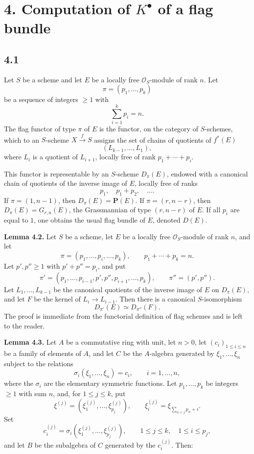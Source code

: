 \documentclass[11pt]{article}
\begin{document}
\section*{4. Computation of \(K^\bullet\) of a flag bundle}

\subsection*{4.1}
Let \(S\) be a scheme and let \(E\) be a locally free \(\mathcal O_S\)-module of rank \(n\). Let
\[
  \pi=(p_1,\ldots,p_k)
\]
be a sequence of integers \(\geq1\) with
\[
  \sum_{i=1}^{k}p_i=n.
\]
The flag functor of type \(\pi\) of \(E\) is the functor, on the category of \(S\)-schemes, which to an \(S\)-scheme \(X\xrightarrow f S\) assigns the set of chains of quotients of \(f^*(E)\)
\[
  (L_{k-1},\ldots,L_1),
\]
where \(L_i\) is a quotient of \(L_{i+1}\), locally free of rank \(p_1+\cdots+p_i\).

This functor is representable by an \(S\)-scheme \(D_\pi(E)\), endowed with a canonical chain of quotients of the inverse image of \(E\), locally free of ranks
\[
  p_1,\quad p_1+p_2,\quad \ldots .
\]
If \(\pi=(1,n-1)\), then \(D_\pi(E)=\mathbf P(E)\). If \(\pi=(r,n-r)\), then \(D_\pi(E)=G_{r,n}(E)\), the Grassmannian of type \((r,n-r)\) of \(E\). If all \(p_i\) are equal to \(1\), one obtains the usual flag bundle of \(E\), denoted \(D(E)\).

\textbf{Lemma 4.2.} Let \(S\) be a scheme, let \(E\) be a locally free \(\mathcal O_S\)-module of rank \(n\), and let
\[
  \pi=(p_1,\ldots,p_i,\ldots,p_k),\qquad p_1+\cdots+p_k=n.
\]
Let \(p',p''\geq1\) with \(p'+p''=p_i\), and put
\[
  \pi'=(p_1,\ldots,p_{i-1},p',p'',p_{i+1},\ldots,p_k),
  \qquad
  \pi''=(p',p'').
\]
Let \(L_1,\ldots,L_{k-1}\) be the canonical quotients of the inverse image of \(E\) on \(D_\pi(E)\), and let \(F\) be the kernel of \(L_i\to L_{i-1}\). Then there is a canonical \(S\)-isomorphism
\[
  D_{\pi'}(E)\simeq D_{\pi''}(F).
\]
The proof is immediate from the functorial definition of flag schemes and is left to the reader.

\textbf{Lemma 4.3.} Let \(A\) be a commutative ring with unit, let \(n>0\), let \((c_i)_{1\leq i\leq n}\) be a family of elements of \(A\), and let \(C\) be the \(A\)-algebra generated by \(\xi_1,\ldots,\xi_n\) subject to the relations
\[
  \sigma_i(\xi_1,\ldots,\xi_n)=c_i,\qquad i=1,\ldots,n,
\]
where the \(\sigma_i\) are the elementary symmetric functions. Let \(p_1,\ldots,p_k\) be integers \(\geq1\) with sum \(n\), and, for \(1\leq j\leq k\), put
\[
  \xi^{(j)}=(\xi^{(j)}_1,\ldots,\xi^{(j)}_{p_j}),
  \qquad
  \xi^{(j)}_i=\xi_{\sum_{\alpha<j}p_\alpha+i}.
\]
Set
\[
  c_i^{(j)}=\sigma_i(\xi^{(j)}_1,\ldots,\xi^{(j)}_{p_j}),
  \qquad 1\leq j\leq k,\quad 1\leq i\leq p_j,
\]
and let \(B\) be the subalgebra of \(C\) generated by the \(c_i^{(j)}\). Then:
\end{document}
